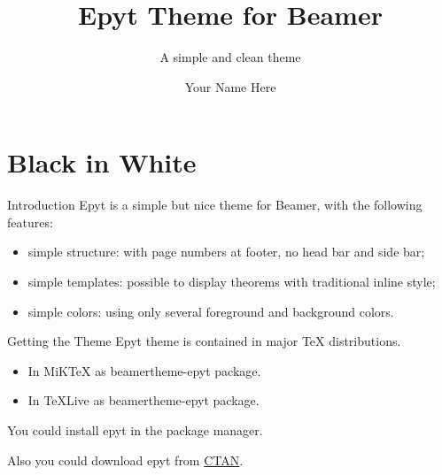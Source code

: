 \documentclass[12pt]{beamer}
\newcommand{\mylead}[1]{\textcolor{acolor1}{#1}}
\newcommand{\mybold}[1]{\textcolor{acolor2}{#1}}
\begin{document}
\title{Epyt Theme for Beamer}
\subtitle{A simple and clean theme}
\author{Your Name Here}

\begin{frame}[plain]\transboxout
\titlepage
\end{frame}


\section{Black in White}

\begin{frame}{Introduction}
\mylead{Epyt} is a simple but nice theme for Beamer, with the following features: \pause
\begin{itemize}[<+->]
\item simple structure: with page numbers at footer, no head bar and side bar;
\item simple templates: possible to display theorems with traditional inline style;
\item simple colors: using only several foreground and background colors.
\end{itemize}
\end{frame}

\begin{frame}{Getting the Theme}
\mylead{Epyt} theme is contained in major TeX distributions.
\begin{itemize}
  \item In MiKTeX as \mybold{beamertheme-epyt} package.
  \item In TeXLive as \mybold{beamertheme-epyt} package.
\end{itemize}
You could install \mylead{epyt} in the package manager.\par\pause
Also you could download \mylead{epyt} from \href{https://www.ctan.org/pkg/beamertheme-epyt}{CTAN}.
\end{frame}

\end{document}
